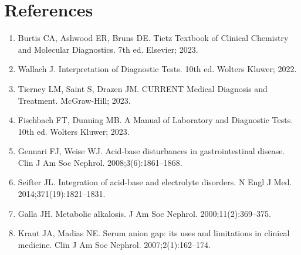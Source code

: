 \section*{References}
\begin{enumerate}
  \item Burtis CA, Ashwood ER, Bruns DE. Tietz Textbook of Clinical Chemistry and Molecular Diagnostics. 7th ed. Elsevier; 2023.
  \item Wallach J. Interpretation of Diagnostic Tests. 10th ed. Wolters Kluwer; 2022.
  \item Tierney LM, Saint S, Drazen JM. CURRENT Medical Diagnosis and Treatment. McGraw-Hill; 2023.
  \item Fischbach FT, Dunning MB. A Manual of Laboratory and Diagnostic Tests. 10th ed. Wolters Kluwer; 2023.
  \item Gennari FJ, Weise WJ. Acid-base disturbances in gastrointestinal disease. Clin J Am Soc Nephrol. 2008;3(6):1861--1868.
  \item Seifter JL. Integration of acid-base and electrolyte disorders. N Engl J Med. 2014;371(19):1821--1831.
  \item Galla JH. Metabolic alkalosis. J Am Soc Nephrol. 2000;11(2):369--375.
  \item Kraut JA, Madias NE. Serum anion gap: its uses and limitations in clinical medicine. Clin J Am Soc Nephrol. 2007;2(1):162--174.
\end{enumerate}

\clearpage
